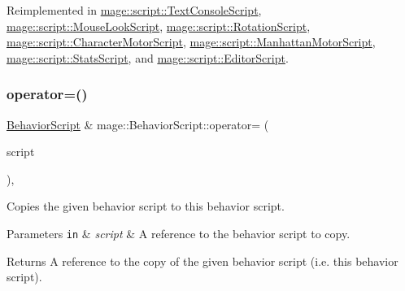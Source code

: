 Reimplemented in \hyperlink{classmage_1_1script_1_1_text_console_script_a1e5a7bdff2d47b835932d7220a4e2571}{mage\+::script\+::\+Text\+Console\+Script}, \hyperlink{classmage_1_1script_1_1_mouse_look_script_a00c8dc8ebaf67da13bd0bc45de3ad8b6}{mage\+::script\+::\+Mouse\+Look\+Script}, \hyperlink{classmage_1_1script_1_1_rotation_script_a7da4165e899facc981c0ee5b1f4a4453}{mage\+::script\+::\+Rotation\+Script}, \hyperlink{classmage_1_1script_1_1_character_motor_script_a20699adf280bed4bfadd4a89d7df33c1}{mage\+::script\+::\+Character\+Motor\+Script}, \hyperlink{classmage_1_1script_1_1_manhattan_motor_script_ac93b09e8f82932f7071b1f591a8004e9}{mage\+::script\+::\+Manhattan\+Motor\+Script}, \hyperlink{classmage_1_1script_1_1_stats_script_a4bfada754da5ca76591c5e7b9b0b1f51}{mage\+::script\+::\+Stats\+Script}, and \hyperlink{classmage_1_1script_1_1_editor_script_af0804c603852f556d362f43e69240b2d}{mage\+::script\+::\+Editor\+Script}.

\hypertarget{classmage_1_1_behavior_script_adb153676123adadacf023e4f3804abf5}{}\label{classmage_1_1_behavior_script_adb153676123adadacf023e4f3804abf5} 
\subsubsection{\texorpdfstring{operator=()}{operator=()}\hspace{0.1cm}{\footnotesize\ttfamily [1/2]}}
{\footnotesize\ttfamily \hyperlink{classmage_1_1_behavior_script}{Behavior\+Script} \& mage\+::\+Behavior\+Script\+::operator= (\begin{DoxyParamCaption}\item[{const \hyperlink{classmage_1_1_behavior_script}{Behavior\+Script} \&}]{script }\end{DoxyParamCaption})\hspace{0.3cm}{\ttfamily [default]}, {\ttfamily [noexcept]}}

Copies the given behavior script to this behavior script.


\begin{DoxyParams}[1]{Parameters}
\mbox{\tt in}  & {\em script} & A reference to the behavior script to copy. \\
\hline
\end{DoxyParams}
\begin{DoxyReturn}{Returns}
A reference to the copy of the given behavior script (i.\+e. this behavior script). 
\end{DoxyReturn}
\hypertarget{classmage_1_1_behavior_script_aefeae227ee8d2452bf05782604f5011e}{}\label{classmage_1_1_behavior_script_aefeae227ee8d2452bf05782604f5011e} 
